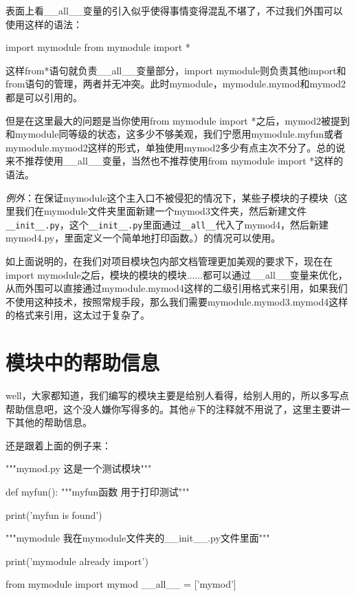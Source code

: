 \documentclass[12pt,oneside]{book}
\begin{document}
\begin{common-format}
表面上看\_{}\_{}all\_{}\_{}变量的引入似乎使得事情变得混乱不堪了，不过我们外围可以使用这样的语法：
\begin{tcbpython}[]
import mymodule
from mymodule import *
\end{tcbpython}
这样from*语句就负责\_{}\_{}all\_{}\_{}变量部分，import mymodule则负责其他import和from语句的管理，两者并无冲突。此时mymodule，mymodule.mymod和mymod2都是可以引用的。

但是在这里最大的问题是当你使用from mymodule import *之后，mymod2被提到和mymodule同等级的状态，这多少不够美观，我们宁愿用mymodule.myfun或者mymodule.mymod2这样的形式，单独使用mymod2多少有点主次不分了。总的说来不推荐使用\_{}\_{}all\_{}\_{}变量，当然也不推荐使用from mymodule import *这样的语法。

\emph{例外}：在保证mymodule这个主入口不被侵犯的情况下，某些子模块的子模块（这里我们在mymodule文件夹里面新建一个mymod3文件夹，然后新建文件\verb+__init__.py+，这个\verb+__init__.py+里面通过\verb+__all__+代入了mymod4，然后新建mymod4.py，里面定义一个简单地打印函数。）的情况可以使用。

如上面说明的，在我们对项目模块包内部文档管理更加美观的要求下，现在在import mymodule之后，模块的模块的模块......都可以通过\_{}\_{}all\_{}\_{}变量来优化，从而外围可以直接通过mymodule.mymod4这样的二级引用格式来引用，如果我们不使用这种技术，按照常规手段，那么我们需要mymodule.mymod3.mymod4这样的格式来引用，这太过于复杂了。


\section{模块中的帮助信息}
well，大家都知道，我们编写的模块主要是给别人看得，给别人用的，所以多写点帮助信息吧，这个没人嫌你写得多的。其他\#{}下的注释就不用说了，这里主要讲一下其他的帮助信息。

还是跟着上面的例子来：
\begin{tcbpython}
"""mymod.py
这是一个测试模块"""

def myfun():
    """myfun函数
    用于打印测试"""

    print('myfun is found')
\end{tcbpython}

\begin{tcbpython}
"""mymodule
我在mymodule文件夹的__init__.py文件里面"""

print('mymodule already import')

from mymodule import mymod
__all__ = ['mymod']
\end{tcbpython}


\end{common-format}
\end{document}
